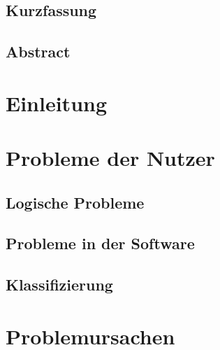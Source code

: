 \documentclass[oneside, ngerman, final, 11pt, a4paper, 1.1headlines, headinclude=false, footinclude=false, mpinclude=false, pagesize, onecolumn, titlepage, parskip=half, headsepline, chapterprefix=false, version=first, listof=totoc, bibliography=totoc, toc=graduated, fleqn, twoside=true]{scrbook}
\begin{document}
	\newpage{}
	
	\section*{\thispagestyle{empty}Kurzfassung}
	
	\textit{\lipsum[1-4]}
	
	\newpage{}
	
	\section*{\thispagestyle{empty}Abstract}
	
	\textit{\lipsum[1-4]}
	
	\newpage{}
	
	\setcounter{page}{1}
	
	\tableofcontents{}
	
	\newpage{}
	
	\setcounter{page}{1} 
	
	\chapter{Einleitung}
	
	
	
	\chapter{Probleme der Nutzer}
	
		\textit{\lipsum[1]}
		
		\section{Logische Probleme}
		\textit{\lipsum[1]}
		
		\section{Probleme in der Software}
		\textit{\lipsum[1]}
		
		\section{Klassifizierung}
		\textit{\lipsum[1]}
	
	\chapter{Problemursachen}
	
\end{document}
